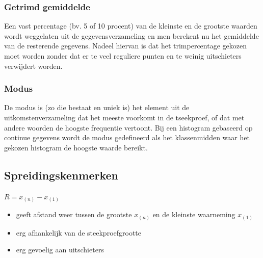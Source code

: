 \documentclass[titlepage]{article}
\numberwithin{equation}{section}
\begin{document}
\subsubsection{Getrimd gemiddelde}
Een vast percentage (bv. 5 of 10 procent) van de kleinste en de grootste waarden wordt weggelaten uit de gegevensverzameling en men berekent nu het gemiddelde van de resterende gegevens. Nadeel hiervan is dat het trimpercentage gekozen moet worden zonder dat er te veel reguliere punten en te weinig uitschieters verwijdert worden.
\subsubsection{Modus}
De modus is (zo die bestaat en uniek is) het element uit de uitkomstenverzameling dat het meeste voorkomt in de tseekproef, of dat met andere woorden de hoogste frequentie vertoont. Bij een histogram gebaseerd op continue gegevens wordt de modus gedefineerd als het klassenmidden waar het gekozen histogram de hoogste waarde bereikt.
\subsection{Spreidingskenmerken}
\begin{center}
	$R = x_{(n)} - x_{(1)}$
\end{center}
\begin{itemize}
	\item geeft afstand weer tussen de grootste $x_{(n)}$ en de kleinste waarneming $x_{(1)}$
	\item erg afhankelijk van de steekproefgrootte
	\item erg gevoelig aan uitschieters
\end{itemize}
\end{document}
